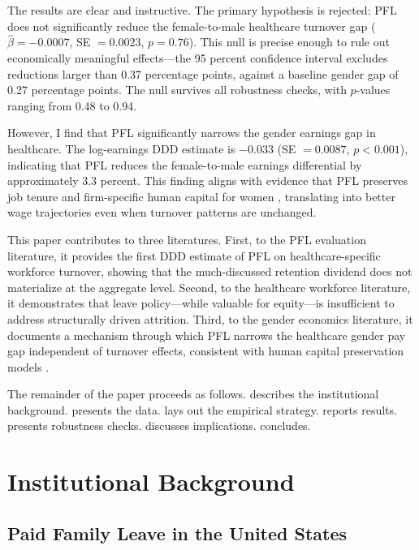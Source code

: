 \documentclass[12pt]{article}
\begin{document}
The results are clear and instructive. The primary hypothesis is rejected: PFL does not significantly reduce the female-to-male healthcare turnover gap ($\hat{\beta} = -0.0007$, SE $= 0.0023$, $p = 0.76$). This null is precise enough to rule out economically meaningful effects---the 95 percent confidence interval excludes reductions larger than 0.37 percentage points, against a baseline gender gap of 0.27 percentage points. The null survives all robustness checks, with $p$-values ranging from 0.48 to 0.94.

However, I find that PFL significantly narrows the gender earnings gap in healthcare. The log-earnings DDD estimate is $-0.033$ (SE $= 0.0087$, $p < 0.001$), indicating that PFL reduces the female-to-male earnings differential by approximately 3.3 percent. This finding aligns with evidence that PFL preserves job tenure and firm-specific human capital for women \citep{dahl2016, stearns2015}, translating into better wage trajectories even when turnover patterns are unchanged.

This paper contributes to three literatures. First, to the PFL evaluation literature, it provides the first DDD estimate of PFL on healthcare-specific workforce turnover, showing that the much-discussed retention dividend does not materialize at the aggregate level. Second, to the healthcare workforce literature, it demonstrates that leave policy---while valuable for equity---is insufficient to address structurally driven attrition. Third, to the gender economics literature, it documents a mechanism through which PFL narrows the healthcare gender pay gap independent of turnover effects, consistent with human capital preservation models \citep{goldin2014}.

The remainder of the paper proceeds as follows.  describes the institutional background.  presents the data.  lays out the empirical strategy.  reports results.  presents robustness checks.  discusses implications.  concludes.


\section{Institutional Background}\label{sec:background}

\subsection{Paid Family Leave in the United States}
\end{document}
